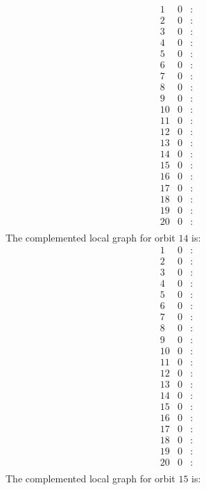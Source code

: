 \documentclass[12pt]{article}
\begin{document}
\begin{equation*}
\begin{array}{rrcl}
1&0&:&\\
2&0&:&\\
3&0&:&\\
4&0&:&\\
5&0&:&\\
6&0&:&\\
7&0&:&\\
8&0&:&\\
9&0&:&\\
10&0&:&\\
11&0&:&\\
12&0&:&\\
13&0&:&\\
14&0&:&\\
15&0&:&\\
16&0&:&\\
17&0&:&\\
18&0&:&\\
19&0&:&\\
20&0&:&\\
\end{array}
\end{equation*}
The complemented local graph for orbit $14$ is:
\begin{equation*}
\begin{array}{rrcl}
1&0&:&\\
2&0&:&\\
3&0&:&\\
4&0&:&\\
5&0&:&\\
6&0&:&\\
7&0&:&\\
8&0&:&\\
9&0&:&\\
10&0&:&\\
11&0&:&\\
12&0&:&\\
13&0&:&\\
14&0&:&\\
15&0&:&\\
16&0&:&\\
17&0&:&\\
18&0&:&\\
19&0&:&\\
20&0&:&\\
\end{array}
\end{equation*}
The complemented local graph for orbit $15$ is:
\end{document}

